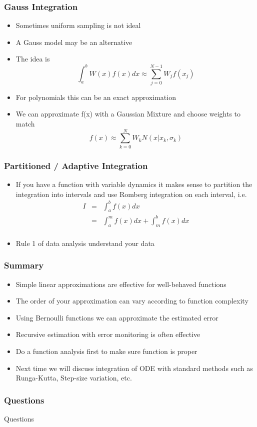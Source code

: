 \documentclass[10pt]{beamer}
\begin{document}
\begin{frame}
  \frametitle{Gauss Integration}
  \begin{itemize}
  \item Sometimes uniform sampling is not ideal
  \item A Gauss model may be an alternative
  \item The idea is
    \[
      \int_a^b W(x) f(x) dx \approx \sum_{j=0}^{N-1} W_j f(x_j)
    \]
  \item For polynomials this can be an exact approximation
  \item We can approximate f(x) with a Gaussian Mixture and choose weights to match
    \[
      f(x) \approx \sum_{k=0}^N W_k N(x | x_k, \sigma_k)
    \]
  \end{itemize}
\end{frame}

\begin{frame}
  \frametitle{Partitioned / Adaptive Integration}
  \begin{itemize}
  \item If you have a function with variable dynamics it makes sense
    to partition the integration into intervals and use Romberg
    integration on each interval, i.e.
    \[
      \begin{array}{rcl}
        I & = & \int_a^b f(x) dx \\
          & = & \int_a^m f(x) dx + \int_m^b f(x) dx\\
      \end{array}
    \]
  \item Rule 1 of data analysis understand your data     
  \end{itemize}
\end{frame}

\begin{frame}
  \frametitle{Summary}
  \begin{itemize}
  \item Simple linear approximations are effective for well-behaved functions
  \item The order of your approximation can vary according to function complexity
  \item Using Bernoulli functions we can approximate the estimated error
  \item Recursive estimation with error monitoring is often effective
  \item Do a function analysis first to make sure function is proper
  \item Next time we will discuss integration of ODE with standard
    methods such as Runga-Kutta, Step-size variation, etc.
  \end{itemize}
\end{frame}
\begin{frame}
  \frametitle{Questions}
  \centerline{\Huge Questions}
\end{frame}
\end{document}
